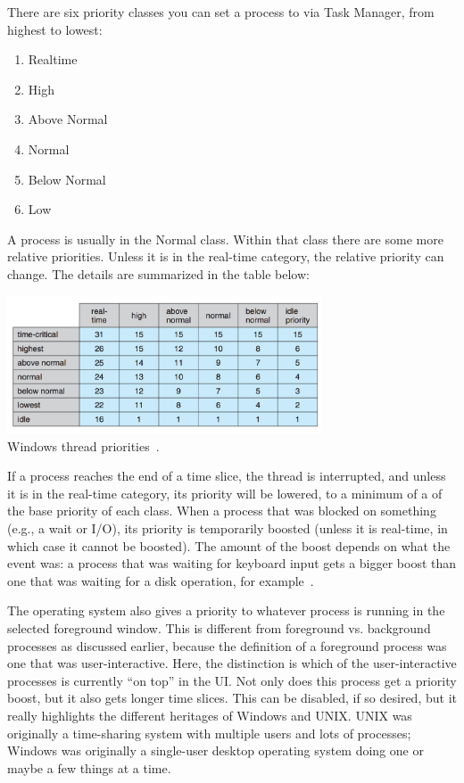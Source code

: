 There are six priority classes you can set a process to via Task Manager, from highest to lowest:
\begin{enumerate}
	\item Realtime
	\item High
	\item Above Normal
	\item Normal
	\item Below Normal
	\item Low
\end{enumerate}

A process is usually in the Normal class. Within that class there are some more relative priorities. Unless it is in the real-time category, the relative priority can change. The details are summarized in the table below:

\begin{center}
	\includegraphics[width=0.7\textwidth]{images/windows-thread-priorities.png}\\
	Windows thread priorities~\cite{osc}.
\end{center}

If a process reaches the end of a time slice, the thread is interrupted, and unless it is in the real-time category, its priority will be lowered, to a minimum of a of the base priority of each class. When a process that was blocked on something (e.g., a wait or I/O), its priority is temporarily boosted (unless it is real-time, in which case it cannot be boosted). The amount of the boost depends on what the event was: a process that was waiting for keyboard input gets a bigger boost than one that was waiting for a disk operation, for example~\cite{osc}. 

The operating system also gives a priority to whatever process is running in the selected foreground window. This is different from foreground vs. background processes as discussed earlier, because the definition of a foreground process was one that was user-interactive. Here, the distinction is which of the user-interactive processes is currently ``on top'' in the UI. Not only does this process get a priority boost, but it also gets longer time slices. This can be disabled, if so desired, but it really highlights the different heritages of Windows and UNIX. UNIX was originally a time-sharing system with multiple users and lots of processes; Windows was originally a single-user desktop operating system doing one or maybe a few things at a time.




